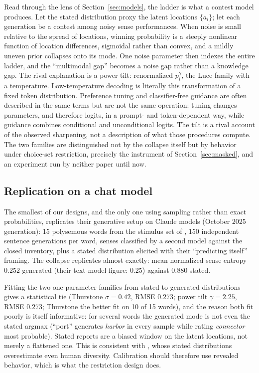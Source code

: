 \documentclass[11pt]{article}
\begin{document}
Read through the lens of Section~\ref{sec:models}, the ladder is what a
contest model produces. Let the stated distribution proxy the latent
locations $\{a_i\}$; let each generation be a contest among noisy sense
performances. When noise is small relative to the spread of locations, winning probability
is a steeply nonlinear function of location differences, sigmoidal rather than
convex, and a mildly uneven prior collapses onto its mode. One noise
parameter then indexes the entire ladder, and the ``multimodal gap''
becomes a noise gap rather than a knowledge gap. The rival explanation is
a power tilt: renormalized $p_i^{\gamma}$, the Luce family with a
temperature. Low-temperature decoding is literally this transformation of a
fixed token distribution. Preference tuning and classifier-free guidance are
often described in the same terms but are not the same operation: tuning
changes parameters, and therefore logits, in a prompt- and token-dependent
way, while guidance combines conditional and unconditional logits. The tilt is
a rival account of the observed sharpening, not a description of what those
procedures compute. The two families are
distinguished not by the collapse itself but by behavior under choice-set
restriction, precisely the instrument of Section~\ref{sec:masked}, and an
experiment run by neither paper until now.

\subsection{Replication on a chat model}

The smallest of our designs, and the only one using sampling rather than
exact probabilities, replicates their generative setup on Claude models
(October 2025 generation): 15 polysemous words from the stimulus set of
\cite{cekinmez2026}, 150 independent sentence generations per word, senses
classified by a second model against the closed inventory, plus a stated
distribution elicited with their ``predicting itself'' framing. The
collapse replicates almost exactly: mean normalized sense entropy $0.252$
generated (their text-model figure: $0.25$) against $0.880$ stated.

Fitting the two one-parameter families from stated to generated
distributions gives a statistical tie (Thurstone $\sigma = 0.42$, RMSE
$0.273$; power tilt $\gamma = 2.25$, RMSE $0.273$; Thurstone the better
fit on 10 of 15 words), and the reason both fit poorly is itself
informative: for several words the generated mode is not even the stated
argmax (``port'' generates \emph{harbor} in every sample while rating
\emph{connector} most probable). Stated reports are a biased window on
the latent locations, not merely a flattened one. This is consistent with
\cite{cekinmez2026}, whose stated distributions overestimate even human
diversity. Calibration should therefore use revealed behavior, which is
what the restriction design does.
\end{document}
